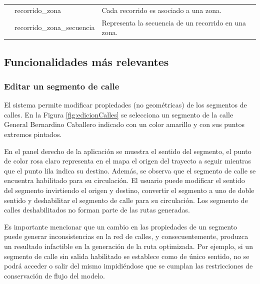 \begin{table}[]
{\begin{tabular}{lll}
                                                                                                 & recorrido\_zona            & Cada recorrido es asociado a una zona.                                                                                                                             \\
                                                                                                 & recorrido\_zona\_secuencia & Representa la secuencia de un recorrido en una zona.                                                                                                               \\ \hline
\end{tabular}%
}
\end{table}

\subsection{Funcionalidades más relevantes}

\subsubsection{Editar un segmento de calle}

El sistema permite modificar propiedades (no geométricas) de los segmentos de calles. En la Figura \ref{fig:edicionCalles} se selecciona un segmento de la calle General Bernardino Caballero indicado con un color amarillo y con sus puntos extremos pintados.

En el panel derecho de la aplicación se muestra el sentido del segmento, el punto de color rosa claro representa en el mapa el origen del trayecto a seguir mientras que el punto lila indica su destino. Además, se observa que el segmento de calle se encuentra habilitado para su circulación. El usuario puede modificar el sentido del segmento invirtiendo el origen y destino, convertir el segmento a uno de doble sentido y deshabilitar el segmento de calle para su circulación. Los segmento de calles deshabilitados no forman parte de las rutas generadas.
 
Es importante mencionar que un cambio en las propiedades de un segmento puede generar inconsistencias en la red de calles, y consecuentemente, produzca un resultado infactible en la generación de la ruta optimizada. Por ejemplo, si un segmento de calle sin salida habilitado se establece como de único sentido, no se podrá acceder o salir del mismo impidiéndose que se cumplan las restricciones de conservación de flujo del modelo.

